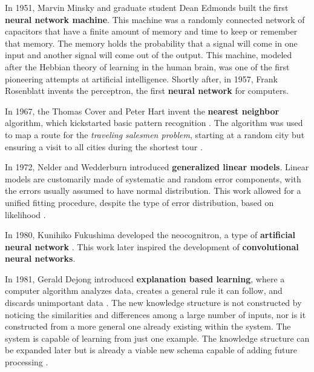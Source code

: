 In 1951, Marvin Minsky and graduate student Dean Edmonds built the first \textbf{neural network machine}. This machine was a randomly connected network of capacitors that have a finite amount of memory and time to keep or remember that memory. The memory holds the probability that a signal will come in one input and another signal will come out of the output. This machine, modeled after the Hebbian theory of learning in the human brain, was one of the first pioneering attempts at artificial intelligence. Shortly after, in 1957, Frank Rosenblatt invents the perceptron, the first \textbf{neural network} for computers. 

In 1967, the Thomas Cover and Peter Hart invent the \textbf{nearest neighbor} algorithm, which kickstarted basic pattern recognition \cite{cover1967nearest}. The algorithm was used to map a route for the \textit{traveling salesmen problem}, starting at a random city but ensuring a visit to all cities during the shortest tour \cite{marr2016short}.

In 1972, Nelder and Wedderburn introduced \textbf{generalized linear models}. Linear models are customarily made of systematic and random error components, with the errors usually assumed to have normal distribution. This work allowed for a unified fitting procedure, despite the type of error distribution, based on likelihood \cite{nelder1972generalized}.

In 1980, Kunihiko Fukushima developed the neocognitron, a type of \textbf{artificial neural network} \cite{fukushima1982neocognitron}. This work later inspired the development of \textbf{convolutional neural networks}.

In 1981, Gerald Dejong introduced \textbf{explanation based learning}, where a computer algorithm analyzes data, creates a general rule it can follow, and discards unimportant data \cite{marr2016short}. The new knowledge structure is not constructed by noticing the similarities and differences among a large number of inputs, nor is it constructed from a more general one already existing within the system. The system is capable of learning from just one example. The knowledge structure can be expanded later but is already a viable new schema capable of adding future processing \cite{dejong1981generalizations}. 

